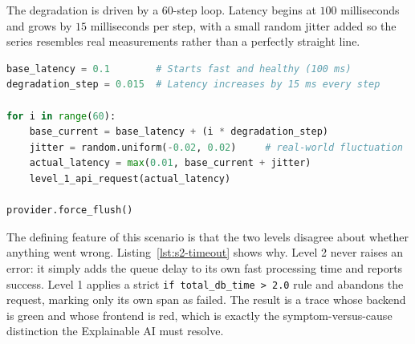 The degradation is driven by a $60$-step loop. Latency begins at $100$
milliseconds and grows by $15$ milliseconds per step, with a small random
jitter added so the series resembles real measurements rather than a perfectly
straight line.

\begin{lstlisting}[language=Python, caption={The time-series degradation loop (\texttt{scenario\_1.py}).}, label={lst:s1-loop}]
base_latency = 0.1        # Starts fast and healthy (100 ms)
degradation_step = 0.015  # Latency increases by 15 ms every step

for i in range(60):
    base_current = base_latency + (i * degradation_step)
    jitter = random.uniform(-0.02, 0.02)     # real-world fluctuation
    actual_latency = max(0.01, base_current + jitter)
    level_1_api_request(actual_latency)

provider.force_flush()
\end{lstlisting}




The defining feature of this scenario is that the two levels disagree about
whether anything went wrong. Listing~\ref{lst:s2-timeout} shows why. Level 2
never raises an error: it simply adds the queue delay to its own fast
processing time and reports success. Level 1 applies a strict
\texttt{if total\_db\_time > 2.0} rule and abandons the request, marking only
its own span as failed. The result is a trace whose backend is green and whose
frontend is red, which is exactly the symptom-versus-cause distinction the
Explainable AI must resolve.

